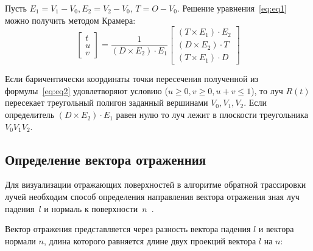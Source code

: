 Пусть $E_1 = V_1 - V_0, E_2 = V_2 - V_0$, $T=O - V_0$. Решение уравнения~\ref{eq:eq1} можно получить методом Крамера:
\begin{equation}\label{eq:eq2}
	\begin{bmatrix}
		t\\
		u\\
		v
	\end{bmatrix} = \frac{1}{(D\times E_2) \cdot E_1}
	\begin{bmatrix}
		(T\times E_1) \cdot E_2\\
		(D\times E_2) \cdot T\\
		(T\times E_1) \cdot D
	\end{bmatrix}
\end{equation}
 
Если баричентически координаты точки пересечения полученной из формулы~\ref{eq:eq2} удовлетворяют условию ($u \geq 0, v \geq 0, u + v \leq 1$), то луч $R(t)$ пересекает треугольный полигон заданный вершинами $V_0, V_1, V_2$. Если определитель $(D\times E_2) \cdot E_1$ равен нулю то луч лежит в плоскости треугольника $V_0V_1V_2$.


%

\subsection{Определение вектора отраженния}

Для визуализации отражающих поверхностей в алгоритме обратной трассировки лучей необходим способ определения направления вектора отражения зная луч падения~$l$ и нормаль к поверхности~$n$~\cite{rtOneWeekend}.


Вектор отражения представляется через разность вектора падения $l$ и вектора нормали $n$, длина которого равняется длине двух проекций вектора $l$ на $n$:

